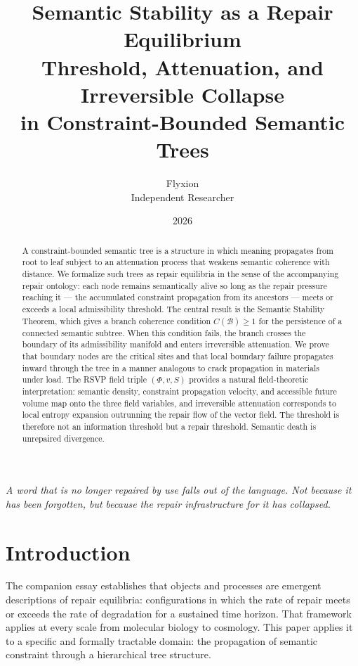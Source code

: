 \documentclass[11pt, a4paper]{article}
\title{\textbf{Semantic Stability as a Repair Equilibrium}\\
{\large Threshold, Attenuation, and Irreversible Collapse\\
in Constraint-Bounded Semantic Trees}}
\author{Flyxion \\ \small Independent Researcher}
\date{2026}
\theoremstyle{definition}
\theoremstyle{remark}
\begin{document}
\maketitle

\begin{abstract}
A constraint-bounded semantic tree is a structure in which meaning propagates
from root to leaf subject to an attenuation process that weakens semantic
coherence with distance. We formalize such trees as repair equilibria in the
sense of the accompanying repair ontology: each node remains semantically
alive so long as the repair pressure reaching it --- the accumulated constraint
propagation from its ancestors --- meets or exceeds a local admissibility
threshold. The central result is the Semantic Stability Theorem, which gives
a branch coherence condition $C(\mathcal{B}) \geq 1$ for the persistence of
a connected semantic subtree. When this condition fails, the branch crosses
the boundary of its admissibility manifold and enters irreversible attenuation.
We prove that boundary nodes are the critical sites and that local boundary
failure propagates inward through the tree in a manner analogous to crack
propagation in materials under load. The RSVP field triple $(\Phi, v, S)$
provides a natural field-theoretic interpretation: semantic density, constraint
propagation velocity, and accessible future volume map onto the three field
variables, and irreversible attenuation corresponds to local entropy expansion
outrunning the repair flow of the vector field. The threshold is therefore not
an information threshold but a repair threshold. Semantic death is unrepaired
divergence.
\end{abstract}

\newpage

\epigraph{\textit{A word that is no longer repaired by use falls out of the
language. Not because it has been forgotten, but because the repair
infrastructure for it has collapsed.}}{}

\section{Introduction}

The companion essay establishes that objects and processes are emergent
descriptions of repair equilibria: configurations in which the rate of repair
meets or exceeds the rate of degradation for a sustained time horizon. That
framework applies at every scale from molecular biology to cosmology. This
paper applies it to a specific and formally tractable domain: the propagation
of semantic constraint through a hierarchical tree structure.
\end{document}
